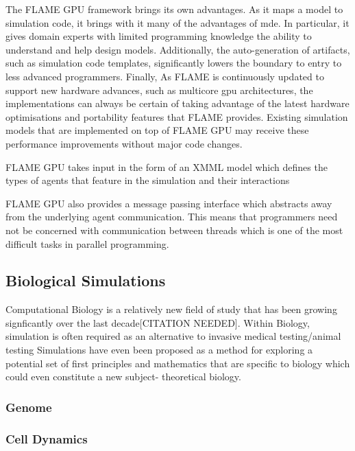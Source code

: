 \documentclass{UoYCSproject}
\begin{document}
The \gls{FLAME GPU} framework brings its own advantages.
As it maps a model to simulation code, it brings with it many of the advantages of \acrlong{mde}.
In particular, it gives domain experts with limited programming knowledge the ability to understand and help design models.
Additionally, the auto-generation of artifacts, such as simulation code templates, significantly lowers the boundary to entry to less advanced programmers.
Finally, As FLAME is continuously updated to support new hardware advances, such as multicore \acrshort{gpu} architectures\cite{flame_simulation}, the implementations can always be certain of taking advantage of the latest hardware optimisations and portability features that FLAME provides. Existing simulation models that are implemented on top of \gls{FLAME GPU} may receive these performance improvements without major code changes.


\gls{FLAME GPU} takes input in the form of an XMML model which defines the types of agents that feature in the simulation and their interactions%

\gls{FLAME GPU} also provides a message passing interface which abstracts away from the underlying agent communication.
This means that programmers need not be concerned with communication between threads which is one of the most difficult tasks in parallel programming.

\subsection{Biological Simulations}
Computational Biology is a relatively new field of study that has been growing signficantly over the last decade[CITATION NEEDED].
Within Biology, simulation is often required as an alternative to invasive medical testing/animal testing
Simulations have even been proposed as a method for exploring a potential set of first principles and mathematics that are specific to biology which could even constitute a new subject- theoretical biology\cite{rise_article}.

\subsubsection{Genome}


\subsubsection{Cell Dynamics}
\end{document}
